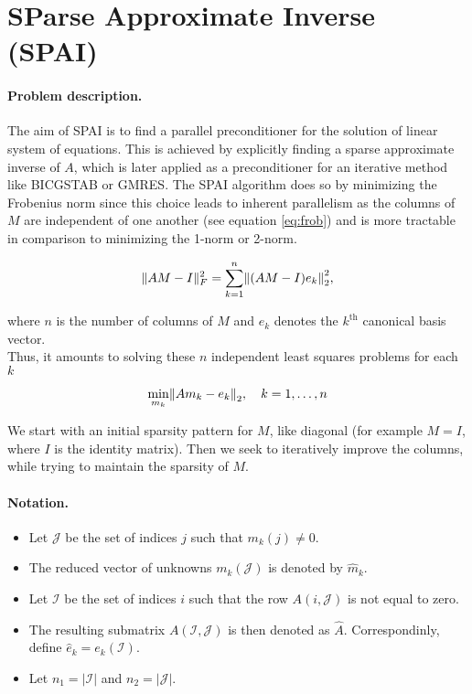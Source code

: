 \documentclass[paper=A4, fontsize=11pt]{scrartcl}
\let\originalleft\left
\let\originalright\right
\renewcommand{\left}{\mathopen{}\mathclose\bgroup\originalleft}
\renewcommand{\right}{\aftergroup\egroup\originalright}
\theoremstyle{remark}
\begin{document}
\section{SParse Approximate Inverse (SPAI)}

\paragraph{Problem description.} The aim of SPAI \cite{grote} is to find a parallel preconditioner for the solution of linear system of equations. This is achieved by explicitly finding a sparse approximate inverse of $A$, which is later applied as a preconditioner for an iterative method like BICGSTAB or GMRES. The SPAI algorithm  does so by minimizing the Frobenius norm since this choice leads to inherent parallelism as the columns of  $M$ are independent of one another (see equation \eqref{eq:frob}) and is more tractable in comparison to minimizing the 1-norm or 2-norm.

\begin{equation}\label{eq:frob}
\|A M-I\|_{F}^{2}=\sum_{k=1}^{n}\left\|(A M-I) e_{k}\right\|_{2}^{2}, 
\end{equation}

where $n$ is the number of columns of $M$ and $e_k$ denotes the $k^{\text{th}}$ canonical basis vector. \\

Thus, it amounts to solving these $n$ independent least squares problems for each $k$


\begin{equation}\label{eq:indp}
\min _{m_{k}}\left\|A m_{k}-e_{k}\right\|_{2}, \quad k=1, \ldots, n
\end{equation}

We start with an initial sparsity pattern for $M$, like diagonal (for example $M = I$, where $I$ is the identity matrix). Then we seek to iteratively improve the columns, while trying to maintain the sparsity of $M$. 

\paragraph{Notation.}
\begin{itemize}
	\item Let \(\mathcal{J}\) be the set of indices \(j\) such that \(m_{k}(j) \neq 0\).
	\item The reduced vector of unknowns \(m_{k}(\mathcal{J})\) is denoted by \(\hat{m}_{k}\).
	\item Let \(\mathcal{I}\) be the set of
	indices \(i\) such that the row \(A(i, \mathcal{J})\) is not equal to zero.
	\item The resulting submatrix \(A(\mathcal{I}, \mathcal{J})\) is then denoted as \(\hat{A}\). Correspondinly, define \(\hat{e}_{k}=e_{k}(\mathcal{I}).\)
	\item Let \(n_{1}=|\mathcal{I}|\) and \(n_{2}=|\mathcal{J}|\).
	
\end{itemize}
\end{document}
